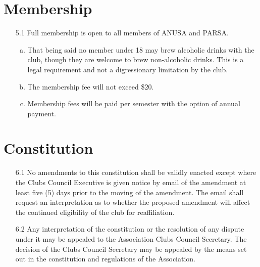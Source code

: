 \documentclass{article}
\begin{document}
\section{Membership}

\begin{enumerate}
    \item[5.1] Full membership is open to all members of ANUSA and PARSA.
    \begin{enumerate}[a.]
        \item That being said no member under 18 may brew alcoholic drinks with the club, though they are welcome to brew non-alcoholic drinks. This is a legal requirement and not a digressionary limitation by the club.
        \item The membership fee will not exceed \$20.
        \item Membership fees will be paid per semester with the option of annual payment.
    \end{enumerate}
\end{enumerate}

\section{Constitution}
\begin{enumerate}
    \item[6.1] No amendments to this constitution shall be validly enacted except where the Clubs Council Executive is given notice by email of the amendment at least five (5) days prior to the moving of the amendment. The email shall request an interpretation as to whether the proposed amendment will affect the continued eligibility of the club for reaffiliation.
    \item[6.2] Any interpretation of the constitution or the resolution of any dispute under it may be appealed to the Association Clubs Council Secretary. The decision of the Clubs Council Secretary may be appealed by the means set out in the constitution and regulations of the Association.
\end{enumerate}
\end{document}
